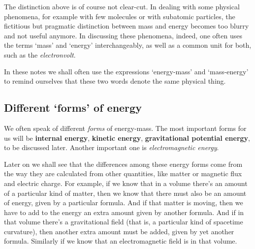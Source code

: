 \documentclass[a4paper,12pt,%
onecolumn,oneside,titlepage,%
british%
]{memoir}
\providecommand{\href}[2]{#2}
\renewcommand*{\|}[1][]{\nonscript\:#1\vert\nonscript\:\mathopen{}}
\newcommand*{\furl}[2]{\href{#1}{#2}\pagenote{\url{#1}}}
\newcommand*{\energym}{energy-mass}
\newcommand*{\masse}{mass-energy}
\begin{document}
\smallskip

The distinction above is of course not clear-cut. In dealing with some physical phenomena, for example with few molecules or with subatomic particles, the fictitious but pragmatic distinction between mass and energy becomes too blurry and not useful anymore. In discussing these phenomena, indeed, one often uses the terms \enquote*{mass} and \enquote*{energy} interchangeably, as well as a common unit for both, such as the \furl{https://home.cern/tags/13-tev}{\emph{electronvolt}}.

\medskip

In these notes we shall often use the expressions \enquote*{\energym} and \enquote*{\masse} to remind ourselves that these two words denote the same physical thing.

\subsection{Different \enquote*{forms} of energy}
\label{sec:forms_energy}

We often speak of different \emph{forms} of \energym. The most important forms for us will be \textbf{internal energy}, \textbf{kinetic energy}, \textbf{gravitational potential energy}, to be discussed later. Another important one is \emph{electromagnetic energy}.

Later on we shall see that the differences among these energy forms come from the way they are calculated from other quantities, like matter or magnetic flux and electric charge. For example, if we know that in a volume there's an amount of a particular kind of matter, then we know that there must also be an amount of energy, given by a particular formula. And if that matter is moving, then we have to add to the energy an extra amount given by another formula. And if in that volume there's a gravitational field (that is, a particular kind of spacetime curvature), then another extra amount must be added, given by yet another formula. Similarly if we know that an electromagnetic field is in that volume.
\end{document}
